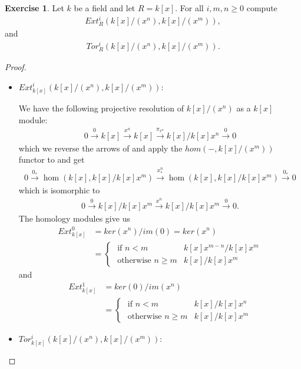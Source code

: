 \documentclass[12pt]{extarticle}
\newcommand{\<}{\langle}
\renewcommand{\>}{\rangle}
\theoremstyle{definition}
\newtheorem{exercise}{Exercise}
\begin{document}
\begin{exercise}
  Let $k$ be a field and let $R = k[x]$. For all $i,m,n \geq 0$ compute
  \begin{align*}
    Ext_R^i(k[x]/(x^n), k[x]/(x^m)),
  \end{align*}
  and
  \begin{align*}
    Tor_R^i(k[x]/(x^n), k[x]/(x^m)).
  \end{align*}
\end{exercise}


\begin{proof}
  \begin{itemize}
  \item
    $Ext_{k[x]}^i(k[x]/(x^n), k[x]/(x^m))$:
    
    We have the following projective resolution of $k[x]/(x^n)$ as a $k[x]$ module:
    \begin{align*}
      0 \xrightarrow{0} k[x] \xrightarrow{x^n} k[x] \xrightarrow{\pi_{x^n}} k[x]/k[x]x^n \xrightarrow{0} 0 
    \end{align*}
    which we reverse the arrows of and apply the $hom(-, k[x]/(x^m))$ functor to and get
    \begin{align*}
      0 \xrightarrow{0_*} \hom(k[x], k[x]/k[x]x^m) \xrightarrow{x^n_*} \hom(k[x], k[x]/k[x]x^m) \xrightarrow{0_*} 0       
    \end{align*}
    which is isomorphic to
    \begin{align*}
      0 \xrightarrow{0} k[x]/k[x]x^m \xrightarrow{x^n} k[x]/k[x]x^m \xrightarrow{0} 0.
    \end{align*}
    The homology modules give us
    \begin{align*}
      Ext_{k[x]}^0
      &= ker(x^n)/im(0) = ker(x^n) \\
      &= 
      \begin{cases}
        \text{ if } n < m & k[x]x^{m-n}/k[x]x^m \\
        \text{ otherwise } n \geq m & k[x]/k[x]x^m 
      \end{cases}
    \end{align*}
    and
    \begin{align*}
      Ext_{k[x]}^1
      &= ker(0)/im(x^n) \\
      &= 
      \begin{cases}
        \text{ if } n < m & k[x]/k[x]x^n \\
        \text{ otherwise } n \geq m & k[x]/k[x]x^m 
      \end{cases}
    \end{align*}
  \item
    $Tor_{k[x]}^i(k[x]/(x^n), k[x]/(x^m)):$


\end{itemize}
\end{proof}
\end{document}
